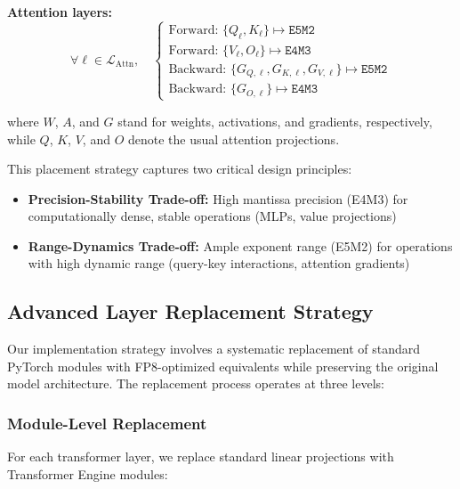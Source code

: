 \documentclass[conference]{IEEEtran}
\begin{document}
\textbf{Attention layers:}
\begin{equation}
\forall \ell \in \mathcal{L}_{\mathrm{Attn}},\quad
\begin{cases}
\text{Forward: } \{Q_\ell, K_\ell\} \mapsto \texttt{E5M2} \\
\text{Forward: } \{V_\ell, O_\ell\} \mapsto \texttt{E4M3} \\
\text{Backward: } \{G_{Q,\ell}, G_{K,\ell}, G_{V,\ell}\} \mapsto \texttt{E5M2} \\
\text{Backward: } \{G_{O,\ell}\} \mapsto \texttt{E4M3}
\end{cases}
\end{equation}

where $W$, $A$, and $G$ stand for weights, activations, and gradients, respectively, while $Q$, $K$, $V$, and $O$ denote the usual attention projections.

This placement strategy captures two critical design principles:
\begin{itemize}
\item \textbf{Precision-Stability Trade-off:} High mantissa precision (E4M3) for computationally dense, stable operations (MLPs, value projections)
\item \textbf{Range-Dynamics Trade-off:} Ample exponent range (E5M2) for operations with high dynamic range (query-key interactions, attention gradients)
\end{itemize}

\subsection{Advanced Layer Replacement Strategy}

Our implementation strategy involves a systematic replacement of standard PyTorch modules with FP8-optimized equivalents while preserving the original model architecture. The replacement process operates at three levels:

\subsubsection{Module-Level Replacement}
For each transformer layer, we replace standard linear projections with Transformer Engine modules:
\end{document}
